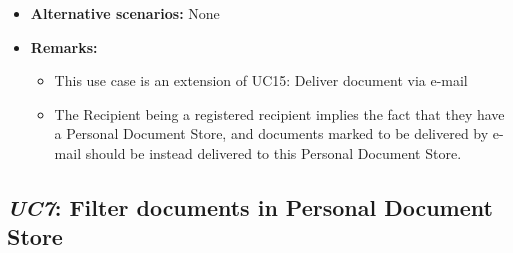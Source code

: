 \documentclass[a4paper,10pt]{article}
\begin{document}
\begin{itemize}
	\item \textbf{Alternative scenarios:} 
	None
	
	\item \textbf{Remarks:}
	\begin{itemize}
		\item This use case is an extension of UC15: Deliver document via e-mail
        \item The Recipient being a registered recipient implies the fact that they have a Personal Document Store, and documents marked to be delivered by e-mail should be instead delivered to this Personal Document Store.
	\end{itemize}
\end{itemize}

\subsection{\emph{UC7}: Filter documents in Personal Document Store}
\end{document}
